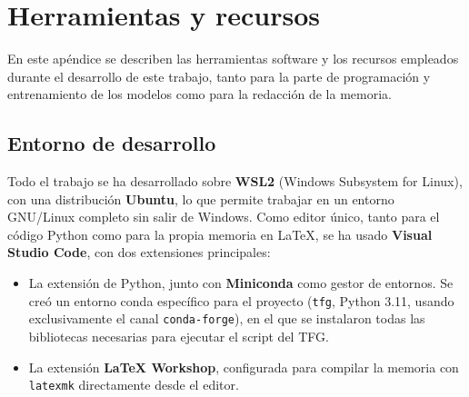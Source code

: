 %
%
%
%
%
%

\chapter{Herramientas y recursos}
\label{cha:herr-y-recurs}

En este apéndice se describen las herramientas software y los recursos empleados durante el desarrollo de este trabajo, tanto para la parte de programación y entrenamiento de los modelos como para la redacción de la memoria.

\section{Entorno de desarrollo}
\label{sec:entorno-desarrollo}

Todo el trabajo se ha desarrollado sobre \textbf{WSL2} (Windows Subsystem for Linux), con una distribución \textbf{Ubuntu}, lo que permite trabajar en un entorno GNU/Linux completo sin salir de Windows. Como editor único, tanto para el código Python como para la propia memoria en \LaTeX{}, se ha usado \textbf{Visual Studio Code}, con dos extensiones principales:

\begin{itemize}
	\item La extensión de Python, junto con \textbf{Miniconda} como gestor de entornos. Se creó un entorno conda específico para el proyecto (\texttt{tfg}, Python 3.11, usando exclusivamente el canal \texttt{conda-forge}), en el que se instalaron todas las bibliotecas necesarias para ejecutar el script del TFG.
	\item La extensión \textbf{LaTeX Workshop}, configurada para compilar la memoria con \texttt{latexmk} directamente desde el editor.
\end{itemize}

